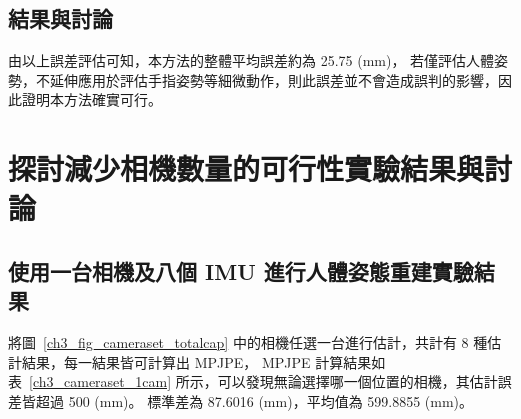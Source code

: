 \subsection{結果與討論}
由以上誤差評估可知，本方法的整體平均誤差約為 25.75 (mm)，
若僅評估人體姿勢，不延伸應用於評估手指姿勢等細微動作，則此誤差並不會造成誤判的影響，因此證明本方法確實可行。

\clearpage

\section{探討減少相機數量的可行性實驗結果與討論}

\subsection{使用一台相機及八個 IMU 進行人體姿態重建實驗結果}
將圖~\ref{ch3_fig_cameraset_totalcap} 中的相機任選一台進行估計，共計有 8 種估計結果，每一結果皆可計算出 MPJPE，
MPJPE 計算結果如表~\ref{ch3_cameraset_1cam} 所示，可以發現無論選擇哪一個位置的相機，其估計誤差皆超過 500 (mm)。
標準差為 87.6016 (mm)，平均值為 599.8855 (mm)。
\begin{table}[!ht]
   \caption[一台相機組合與其估計結果誤差]{一台相機組合與其估計結果誤差}
   \centering
   \label{ch3_cameraset_1cam}
   \setlength{\tabcolsep}{3pt}
   \renewcommand\arraystretch{1.5}
\end{table}
\clearpage

